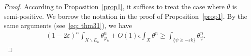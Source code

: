 \documentclass[a4paper]{amsart}
\numberwithin{equation}{section}
\theoremstyle{definition}
\numberwithin{equation}{section}
\begin{document}
\begin{proof} According to Proposition~\ref{prop1}, it suffices to treat the case where $\theta$ is semi-positive.
We borrow the notation in the proof of Proposition~\ref {prop1}. By the same arguments (see~\eqref{eq: thm31}), we have
\begin{equation}\label{eq}
	\begin{split}
	(1 - 2\varepsilon )^{ n } \int_{ X\backslash E_k }  \theta_{ \varphi_k } ^n   + O(1) \epsilon \int_{ X } \theta^n \geq \int_{ \{ \psi \geq  - \varepsilon k \} }  \theta_{ \psi }^n.
	\end{split}
 \end{equation} 

\end{proof}
\end{document}
